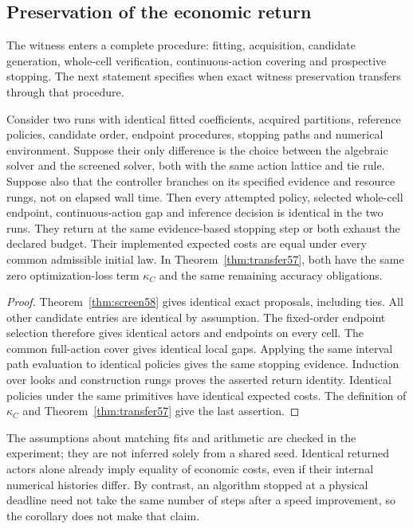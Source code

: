 \subsection{Preservation of the economic return}
The witness enters a complete procedure: fitting, acquisition, candidate generation, whole-cell verification, continuous-action covering and prospective stopping. The next statement specifies when exact witness preservation transfers through that procedure.

\begin{corollary}\label{cor:return-identity58}
Consider two runs with identical fitted coefficients, acquired partitions, reference policies, candidate order, endpoint procedures, stopping paths and numerical environment. Suppose their only difference is the choice between the algebraic solver and the screened solver, both with the same action lattice and tie rule. Suppose also that the controller branches on its specified evidence and resource rungs, not on elapsed wall time. Then every attempted policy, selected whole-cell endpoint, continuous-action gap and inference decision is identical in the two runs. They return at the same evidence-based stopping step or both exhaust the declared budget. Their implemented expected costs are equal under every common admissible initial law. In Theorem~\ref{thm:transfer57}, both have the same zero optimization-loss term $\kappa_C$ and the same remaining accuracy obligations.
\end{corollary}
\begin{proof}
Theorem~\ref{thm:screen58} gives identical exact proposals, including ties. All other candidate entries are identical by assumption. The fixed-order endpoint selection therefore gives identical actors and endpoints on every cell. The common full-action cover gives identical local gaps. Applying the same interval path evaluation to identical policies gives the same stopping evidence. Induction over looks and construction rungs proves the asserted return identity. Identical policies under the same primitives have identical expected costs. The definition of $\kappa_C$ and Theorem~\ref{thm:transfer57} give the last assertion.
\end{proof}

The assumptions about matching fits and arithmetic are checked in the experiment; they are not inferred solely from a shared seed. Identical returned actors alone already imply equality of economic costs, even if their internal numerical histories differ. By contrast, an algorithm stopped at a physical deadline need not take the same number of steps after a speed improvement, so the corollary does not make that claim.

